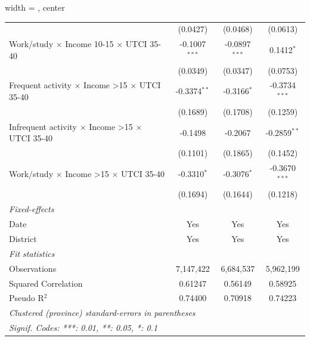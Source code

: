 \begin{table}[htbp]
\begin{adjustbox}{width = \textwidth, center}
\begin{tabular}{lccc}
                                                                         & (0.0427)                  & (0.0468)                & (0.0613)\\   
         Work/study $\times$ Income 10-15 $\times$ UTCI 35-40            & -0.1007$^{***}$           & -0.0897$^{***}$         & 0.1412$^{*}$\\   
                                                                         & (0.0349)                  & (0.0347)                & (0.0753)\\   
         Frequent activity $\times$ Income >15 $\times$ UTCI 35-40       & -0.3374$^{**}$            & -0.3166$^{*}$           & -0.3734$^{***}$\\   
                                                                         & (0.1689)                  & (0.1708)                & (0.1259)\\   
         Infrequent activity $\times$ Income >15 $\times$ UTCI 35-40     & -0.1498                   & -0.2067                 & -0.2859$^{**}$\\   
                                                                         & (0.1101)                  & (0.1865)                & (0.1452)\\   
         Work/study $\times$ Income >15 $\times$ UTCI 35-40              & -0.3310$^{*}$             & -0.3076$^{*}$           & -0.3670$^{***}$\\   
                                                                         & (0.1694)                  & (0.1644)                & (0.1218)\\   
         \midrule
         \emph{Fixed-effects}\\
         Date                                                            & Yes                       & Yes                     & Yes\\  
         District                                                        & Yes                       & Yes                     & Yes\\  
         \midrule
         \emph{Fit statistics}\\
         Observations                                                    & 7,147,422                 & 6,684,537               & 5,962,199\\  
         Squared Correlation                                             & 0.61247                   & 0.56149                 & 0.58925\\  
         Pseudo R$^2$                                                    & 0.74400                   & 0.70918                 & 0.74223\\  
         \midrule \midrule
         \multicolumn{4}{l}{\emph{Clustered (province) standard-errors in parentheses}}\\
         \multicolumn{4}{l}{\emph{Signif. Codes: ***: 0.01, **: 0.05, *: 0.1}}\\
      \end{tabular}
   \end{adjustbox}
\end{table}


